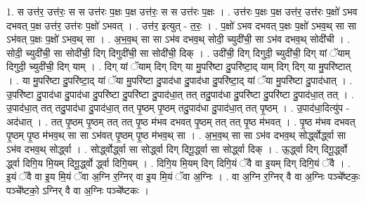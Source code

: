 \documentclass[17pt]{extarticle}
\begin{document}
1. स उत्त॑र॒ उत्त॑रः॒ स स उत्त॑रः प॒क्षः प॒क्ष उत्त॑रः॒ स स उत्त॑रः प॒क्षः । . उत्त॑रः प॒क्षः प॒क्ष उत्त॑र॒ उत्त॑रः प॒क्षो॑ ऽभव दभवत् प॒क्ष उत्त॑र॒ उत्त॑रः प॒क्षो॑ ऽभवत् । . उत्त॑र॒ इत्युत् - त॒रः॒ । . प॒क्षो॑ ऽभव दभवत् प॒क्षः प॒क्षो॑ ऽभव॒थ् सा सा ऽभ॑वत् प॒क्षः प॒क्षो॑ ऽभव॒थ् सा । . अ॒भ॒व॒थ् सा सा ऽभ॑व दभव॒थ् सोदी॒ च्युदी॑ची॒ सा ऽभ॑व दभव॒थ् सोदी॑ची । . सोदी॒ च्युदी॑ची॒ सा सोदी॑ची॒ दिग् दिगुदी॑ची॒ सा सोदी॑ची॒ दिक् । . उदी॑ची॒ दिग् दिगुदी॒ च्युदी॑ची॒ दिग् यां ॅयाम् दिगुदी॒ च्युदी॑ची॒ दिग् याम् । . दिग् यां ॅयाम् दिग् दिग् या मु॒परि॑ष्टा दु॒परि॑ष्टा॒द् याम् दिग् दिग् या मु॒परि॑ष्टात् । . या मु॒परि॑ष्टा दु॒परि॑ष्टा॒द् यां ॅया मु॒परि॑ष्टा दु॒पाद॑धा दु॒पाद॑धा दु॒परि॑ष्टा॒द् यां ॅया मु॒परि॑ष्टा दु॒पाद॑धात् । . उ॒परि॑ष्टा दु॒पाद॑धा दु॒पाद॑धा दु॒परि॑ष्टा दु॒परि॑ष्टा दु॒पाद॑धा॒त् तत् तदु॒पाद॑धा दु॒परि॑ष्टा दु॒परि॑ष्टा दु॒पाद॑धा॒त् तत् । . उ॒पाद॑धा॒त् तत् तदु॒पाद॑धा दु॒पाद॑धा॒त् तत् पृ॒ष्ठम् पृ॒ष्ठम् तदु॒पाद॑धा दु॒पाद॑धा॒त् तत् पृ॒ष्ठम् । . उ॒पाद॑धा॒दित्यु॑प - अद॑धात् । . तत् पृ॒ष्ठम् पृ॒ष्ठम् तत् तत् पृ॒ष्ठ म॑भव दभवत् पृ॒ष्ठम् तत् तत् पृ॒ष्ठ म॑भवत् । . पृ॒ष्ठ म॑भव दभवत् पृ॒ष्ठम् पृ॒ष्ठ म॑भव॒थ् सा सा ऽभ॑वत् पृ॒ष्ठम् पृ॒ष्ठ म॑भव॒थ् सा । . अ॒भ॒व॒थ् सा सा ऽभ॑व दभव॒थ् सोर्द्ध्वोर्द्ध्वा सा ऽभ॑व दभव॒थ् सोर्द्ध्वा । . सोर्द्ध्वोर्द्ध्वा सा सोर्द्ध्वा दिग् दिगू॒र्द्ध्वा सा सोर्द्ध्वा दिक् । . ऊ॒र्द्ध्वा दिग् दिगू॒र्द्ध्वो र्द्ध्वा दिगि॒य मि॒यम् दिगू॒र्द्ध्वो र्द्ध्वा दिगि॒यम् । . दिगि॒य मि॒यम् दिग् दिगि॒यं ॅवै वा इ॒यम् दिग् दिगि॒यं ॅवै । . इ॒यं ॅवै वा इ॒य मि॒यं ॅवा अ॒ग्नि र॒ग्निर् वा इ॒य मि॒यं ॅवा अ॒ग्निः । . वा अ॒ग्नि र॒ग्निर् वै वा अ॒ग्निः पञ्चे᳚ष्टकः॒ पञ्चे᳚ष्टको॒ ऽग्निर् वै वा अ॒ग्निः पञ्चे᳚ष्टकः । \newline
\end{document}
